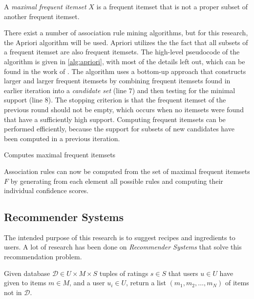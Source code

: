 \begin{definition}
	A \emph{maximal frequent itemset} $X$ is a frequent itemset that is not a proper subset of another frequent itemset.
\end{definition}

There exist a number of association rule mining algorithms, but for this research, the Apriori algorithm will be used.
Apriori utilizes the the fact that all subsets of a frequent itemset are also frequent itemsets.
The high-level pseudocode of the algorithm is given in \cref{alg:apriori}, with most of the details left out, which can be found in the work of \cite{Agrawal1993}.
The algorithm uses a bottom-up approach that constructs larger and larger frequent itemsets by combining frequent itemsets found in earlier iteration into a \emph{candidate set} (line $7$) and then testing for the minimal support (line $8$).
The stopping criterion is that the frequent itemset of the previous round should not be empty, which occurs when no itemsets were found that have a sufficiently high support.
Computing frequent itemsets can be performed efficiently, because the support for subsets of new candidates have been computed in a previous iteration.

\begin{algorithm}[htbp]
	\caption{Computes maximal frequent itemsets}
	\label{alg:apriori}
	
\end{algorithm}

Association rules can now be computed from the set of maximal frequent itemsets $F$ by generating from each element all possible rules and computing their individual confidence scores.




\subsection{Recommender Systems}
\label{subsec:recommender_systems}

The intended purpose of this research is to suggest recipes and ingredients to users.
A lot of research has been done on \emph{Recommender Systems} that solve this recommendation problem.

\begin{definition}
	Given database $\mathcal{D} \in U \times M \times S$ tuples of ratings $s\in S$ that users $u \in U$ have given to items $m \in M$, and a user $u_i \in U$, return a list $(m_1, m_2, \dots, m_N)$ of items not in $\mathcal{D}$.
\end{definition}

